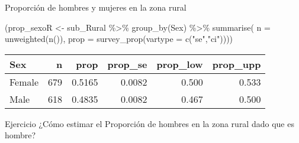 \documentclass[
  ignorenonframetext,
]{beamer}
\newenvironment{Shaded}{\begin{snugshade}}{\end{snugshade}}
\newcommand{\AttributeTok}[1]{\textcolor[rgb]{0.77,0.63,0.00}{#1}}
\newcommand{\FunctionTok}[1]{\textcolor[rgb]{0.00,0.00,0.00}{#1}}
\newcommand{\NormalTok}[1]{#1}
\newcommand{\OtherTok}[1]{\textcolor[rgb]{0.56,0.35,0.01}{#1}}
\newcommand{\SpecialCharTok}[1]{\textcolor[rgb]{0.00,0.00,0.00}{#1}}
\newcommand{\StringTok}[1]{\textcolor[rgb]{0.31,0.60,0.02}{#1}}
\begin{document}
\begin{frame}[fragile]{Proporción de hombres y mujeres en la zona rural}
\protect\hypertarget{proporciuxf3n-de-hombres-y-mujeres-en-la-zona-rural}{}
\begin{Shaded}
\begin{Highlighting}[]
\NormalTok{(prop\_sexoR }\OtherTok{\textless{}{-}}\NormalTok{ sub\_Rural }\SpecialCharTok{\%\textgreater{}\%} \FunctionTok{group\_by}\NormalTok{(Sex) }\SpecialCharTok{\%\textgreater{}\%} 
   \FunctionTok{summarise}\NormalTok{(}
     \AttributeTok{n =} \FunctionTok{unweighted}\NormalTok{(}\FunctionTok{n}\NormalTok{()),}
     \AttributeTok{prop =} \FunctionTok{survey\_prop}\NormalTok{(}\AttributeTok{vartype =} \FunctionTok{c}\NormalTok{(}\StringTok{"se"}\NormalTok{,}\StringTok{"ci"}\NormalTok{))))}
\end{Highlighting}
\end{Shaded}

\begin{longtable}[]{@{}lrrrrr@{}}
\toprule
Sex & n & prop & prop\_se & prop\_low & prop\_upp \\
\midrule
\endhead
Female & 679 & 0.5165 & 0.0082 & 0.500 & 0.533 \\
Male & 618 & 0.4835 & 0.0082 & 0.467 & 0.500 \\
\bottomrule
\end{longtable}

\pause

\begin{block}{Ejercicio}
\protect\hypertarget{ejercicio-1}{}
¿Cómo estimar el Proporción de hombres en la zona rural dado que es
hombre?
\end{block}
\end{frame}
\end{document}
